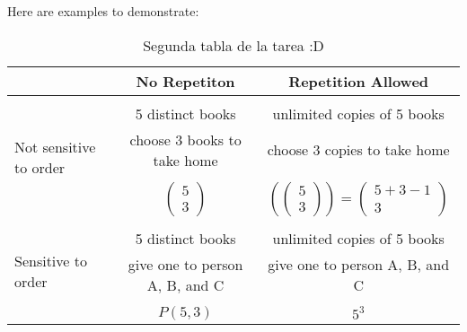 \documentclass[10pt,onecolumn,letterpaper]{article}
\begin{document}
Here are examples to demonstrate:
\\
\begin{table}[h!]
\begin{center}
\begin{tabular}{|l||c|c|}
    \hline
     &No Repetiton&Repetition Allowed \\ \hline \hline
    \multirow{5}{*}{Not sensitive to order}& & \\
    &5 distinct books &unlimited copies of 5 books\\
    &choose 3 books to take home &choose 3 copies to take home\\
    & & \\
    & $\left(\begin{array}{c}
     5\\
     3
\end{array}\right)$& $\left(\left(\begin{array}{c}
     5\\
     3
\end{array}\right)\right)=\left(\begin{array}{c}
     5+3-1\\
     3
\end{array}\right)$ \\\hline
        \multirow{5}{*}{Sensitive to order}& & \\
    &5 distinct books &unlimited copies of 5 books\\
    &give one to person A, B, and C &give one to person A, B, and C\\
    & & \\
    &$P(5,3)$ &$5^3$ \\
    \hline
\end{tabular}\caption{Segunda tabla de la tarea :D}
\end{center}
\label{Segunda tablal}
\end{table}\\
\end{document}
